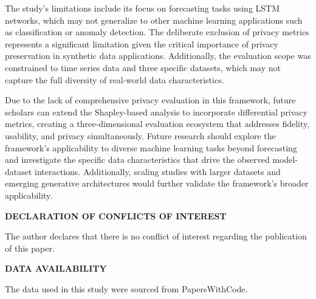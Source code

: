 \documentclass{article}
\begin{document}
The study's limitations include its focus on forecasting tasks using LSTM networks, which may not generalize to other machine learning applications such as classification or anomaly detection. The deliberate exclusion of privacy metrics represents a significant limitation given the critical importance of privacy preservation in synthetic data applications. Additionally, the evaluation scope was constrained to time series data and three specific datasets, which may not capture the full diversity of real-world data characteristics.

Due to the lack of comprehensive privacy evaluation in this framework, future scholars can extend the Shapley-based analysis to incorporate differential privacy metrics, creating a three-dimensional evaluation ecosystem that addresses fidelity, usability, and privacy simultaneously. Future research should explore the framework's applicability to diverse machine learning tasks beyond forecasting and investigate the specific data characteristics that drive the observed model-dataset interactions. Additionally, scaling studies with larger datasets and emerging generative architectures would further validate the framework's broader applicability.



\newpage

\begin{center}
\Large\textbf{DECLARATION OF CONFLICTS OF INTEREST}
\end{center}

\vspace{1em}

The author declares that there is no conflict of interest regarding the publication of this paper.

\newpage

\begin{center}
\Large\textbf{DATA AVAILABILITY}
\end{center}

\vspace{1em}

The data used in this study were sourced from PapersWithCode.

\newpage
\printbibliography
\end{document}
